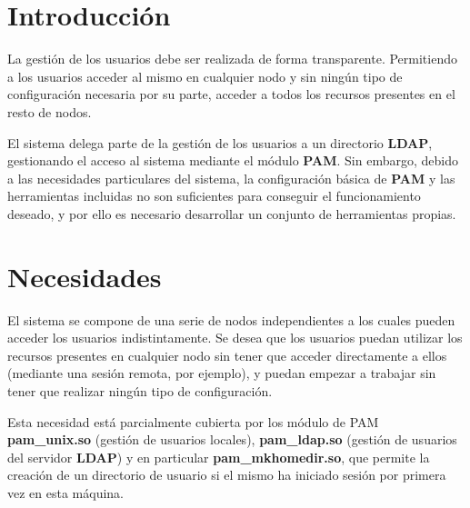 \documentclass{article}
\title{\hmwkTitle}
\author{\textbf{\hmwkAuthorName}}
\date{1 de mayo de 2015}
\begin{document}
\maketitle


\setcounter{tocdepth}{1}

\newpage
\tableofcontents

\section{Introducción}

La gestión de los usuarios debe ser realizada de forma transparente. Permitiendo a los usuarios acceder al mismo en cualquier nodo y sin ningún tipo de configuración necesaria por su parte, acceder a todos los recursos presentes en el resto de nodos.

El sistema delega parte de la gestión de los usuarios a un directorio \textbf{LDAP}, gestionando el acceso al sistema mediante el módulo \textbf{PAM}. Sin embargo, debido a las necesidades particulares del sistema, la configuración básica de \textbf{PAM} y las herramientas incluidas no son suficientes para conseguir el funcionamiento deseado, y por ello es necesario desarrollar un conjunto de herramientas propias.

\section{Necesidades}

El sistema se compone de una serie de nodos independientes a los cuales pueden acceder los usuarios indistintamente. Se desea que los usuarios puedan utilizar los recursos presentes en cualquier nodo sin tener que acceder directamente a ellos (mediante una sesión remota, por ejemplo), y puedan empezar a trabajar sin tener que realizar ningún tipo de configuración.

Esta necesidad está parcialmente cubierta por los módulo de PAM \textbf{pam\_unix.so} (gestión de usuarios locales)\cite{man_pam_unix}, \textbf{pam\_ldap.so} (gestión de usuarios del servidor \textbf{LDAP})\cite{man_pam_ldap} y en particular \textbf{pam\_mkhomedir.so}\cite{man_pam_mkhomedir}, que permite la creación de un directorio de usuario si el mismo ha iniciado sesión por primera vez en esta máquina.
\end{document}
